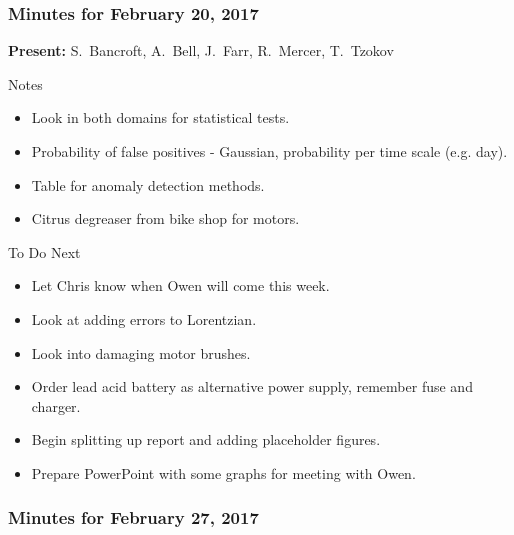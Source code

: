 \noindent\makebox[\linewidth]{\rule{0.7\textwidth}{0.4pt}} \clearpage

\subsubsection*{Minutes for February 20, 2017}

\textbf{Present:} 
{S.~Bancroft,
  A.~Bell,
  J.~Farr,
  R.~Mercer,
  T.~Tzokov}
  
\large{Notes}
\begin{itemize}
\item
Look in both domains for statistical tests.

\item
Probability of false positives - Gaussian, probability per time scale (e.g. day).

\item
Table for anomaly detection methods.

\item
Citrus degreaser from bike shop for motors.


\end{itemize}


\large{To Do Next}
\begin{itemize}
\item
Let Chris know when Owen will come this week.

\item
Look at adding errors to Lorentzian.

\item
Look into damaging motor brushes.

\item
Order lead acid battery as alternative power supply, remember fuse and charger.

\item
Begin splitting up report and adding placeholder figures.

\item
Prepare PowerPoint with some graphs for meeting with Owen.
\end{itemize}

\noindent\makebox[\linewidth]{\rule{0.7\textwidth}{0.4pt}} %
\vspace{-5ex}
\subsubsection*{Minutes for February 27, 2017}

